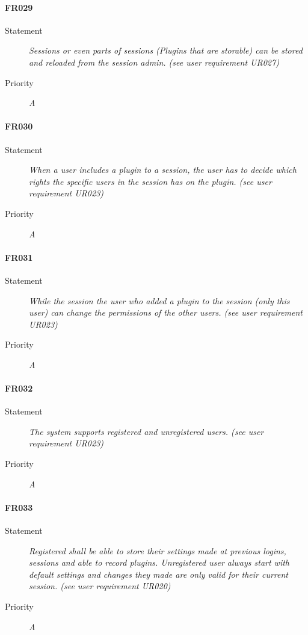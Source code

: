 \paragraph{FR029}
\begin{description}
	\item[Statement]
		\textit{Sessions or even parts of sessions (Plugins that are storable) can be stored and reloaded from the session admin.
		(see user requirement UR027)}
	\item[Priority] \textit{A}
\end{description}

\paragraph{FR030}
\begin{description}
	\item[Statement]
		\textit{When a user includes a plugin to a session, the user has to decide which rights the specific users in the session has on the plugin.
		(see user requirement UR023)}
	\item[Priority] \textit{A}
\end{description}

\paragraph{FR031}
\begin{description}
	\item[Statement]
		\textit{While the session the user who added a plugin to the session (only this user) can change the permissions of the other users.
		(see user requirement UR023)}
	\item[Priority] \textit{A}
\end{description}

\paragraph{FR032}
\begin{description}
	\item[Statement]
		\textit{The system supports registered and unregistered users. 
		(see user requirement UR023)}
	\item[Priority] \textit{A}
\end{description}

\paragraph{FR033}
\begin{description}
	\item[Statement]
		\textit{Registered shall be able to store their settings made at previous logins, sessions and able to record plugins. Unregistered user always start with default settings and changes they made
are only valid for their current session. 
		(see user requirement UR020)}
	\item[Priority] \textit{A}
\end{description}

